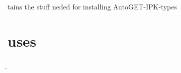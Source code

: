 \documentclass{report}
\begin{document}
tains the stuff neded for installing AutoGET{-}IPK{-}types
\section{uses}
\b
\end{document}
